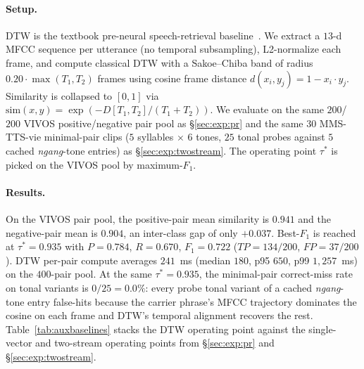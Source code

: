 \documentclass[a4paper,fleqn]{cas-dc}
\begin{document}
\paragraph{Setup.} DTW is the textbook pre-neural speech-retrieval baseline~\citep{sakoe1978dtw}. We extract a $13$-d MFCC sequence per utterance (no temporal subsampling), L2-normalize each frame, and compute classical DTW with a Sakoe--Chiba band of radius $0.20 \cdot \max(T_1, T_2)$ frames using cosine frame distance $d(x_i, y_j) = 1 - x_i \cdot y_j$. Similarity is collapsed to $[0, 1]$ via $\mathrm{sim}(x, y) = \exp(-D[T_1, T_2] / (T_1 + T_2))$. We evaluate on the same $200$/$200$ VIVOS positive/negative pair pool as \S\ref{sec:exp:pr} and the same $30$ MMS-TTS-vie minimal-pair clips ($5$ syllables $\times$ $6$ tones, $25$ tonal probes against $5$ cached \emph{ngang}-tone entries) as \S\ref{sec:exp:twostream}. The operating point $\tau^{*}$ is picked on the VIVOS pool by maximum-$F_1$.

\paragraph{Results.} On the VIVOS pair pool, the positive-pair mean similarity is $0.941$ and the negative-pair mean is $0.904$, an inter-class gap of only $+0.037$. Best-$F_1$ is reached at $\tau^{*} = 0.935$ with $P = 0.784$, $R = 0.670$, $F_1 = 0.722$ ($TP = 134/200$, $FP = 37/200$). DTW per-pair compute averages $241$~ms (median $180$, p95 $650$, p99 $1{,}257$~ms) on the $400$-pair pool. At the same $\tau^{*} = 0.935$, the minimal-pair correct-miss rate on tonal variants is $0/25 = 0.0\%$: every probe tonal variant of a cached \emph{ngang}-tone entry false-hits because the carrier phrase's MFCC trajectory dominates the cosine on each frame and DTW's temporal alignment recovers the rest. Table~\ref{tab:auxbaselines} stacks the DTW operating point against the single-vector and two-stream operating points from \S\ref{sec:exp:pr} and \S\ref{sec:exp:twostream}.
\end{document}
